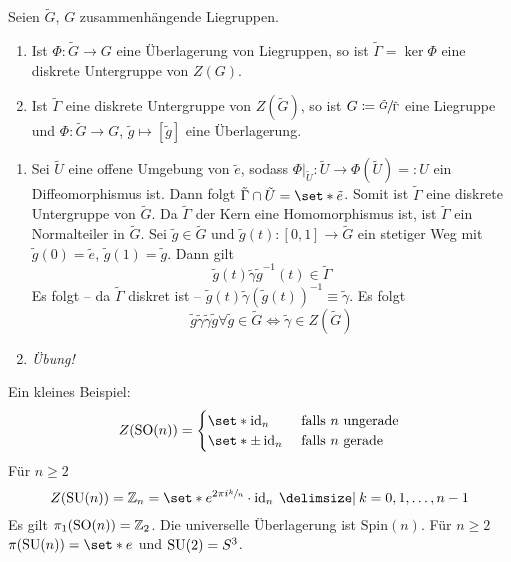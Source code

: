 \begin{korollar}[label=lem:133]
    Seien $\tilde{G}$, $G$ zusammenhängende Liegruppen. 
    \begin{enumerate}[1)]
        \item Ist $\Phi \colon \tilde{G} \to G$ eine Überlagerung von Liegruppen, so ist $\tilde{\Gamma} = \ker \Phi$ eine diskrete Untergruppe von $Z(G)$.
        \item Ist $\tilde{\Gamma}$ eine diskrete Untergruppe von $Z(\tilde{G})$, so ist $G \coloneqq \sfrac{\tilde{G}}{\tilde{\Gamma}}$ eine Liegruppe und $\Phi \colon \tilde{G} \to G$, $\tilde{g} \mapsto [\tilde{g}]$ eine Überlagerung.
    \end{enumerate}
\end{korollar}
\begin{beweis}
    \begin{enumerate}[1)]
        \item Sei $\tilde{U}$ eine offene Umgebung von $\tilde{e}$, sodass $\Phi|_{\tilde{U}} \colon \tilde{U} \to \Phi(\tilde{U}) =: U$ ein Diffeomorphismus ist.
        Dann folgt $\tilde{\Gamma} \cap \tilde{U} = \set*{\tilde{e}}$.
        Somit ist $\tilde{\Gamma}$ eine diskrete Untergruppe von $\tilde{G}$.
        Da $\tilde{\Gamma}$ der Kern eine Homomorphismus ist, ist $\tilde{\Gamma}$ ein Normalteiler in $\tilde{G}$.
        Sei $\tilde{g} \in \tilde{G}$ und $\tilde{g}(t) \colon [0,1] \to \tilde{G}$ ein stetiger Weg mit $\tilde{g}(0)=\tilde{e}$, $\tilde{g}(1)=\tilde{g}$.
        Dann gilt
        \[
            \tilde{g}(t) \tilde{\gamma} \tilde{g}^{-1}(t) \in \tilde{\Gamma}
        \]
        Es folgt -- da $\tilde{\Gamma}$ diskret ist -- $\tilde{g}(t) \tilde{\gamma} (\tilde{g}(t))^{-1} \equiv \tilde{\gamma}$.
        Es folgt 
        \[
            \tilde{g} \tilde{\gamma} \tilde{\gamma} \tilde{g} \forall \tilde{g} \in \tilde{G} \iff \tilde{\gamma} \in Z(\tilde{G})
        \]
        \item \emph{Übung!}
    \end{enumerate}
\end{beweis}

Ein kleines Beispiel:
\[
    Z \enbrace*{\SO(n)} = \begin{cases}
        \set*{\id_n} &\text{ falls } n \text{ ungerade} \\
        \set*{\pm \id_n} &\text{ falls $n$ gerade}
    \end{cases}
\]
Für $n \ge 2$
\[
    Z \enbrace*{\SU(n)} = \mathbb{Z}_n = \set*{e^{2 \pi i \sfrac{k}{n}} \cdot \id_n \given k=0,1,\ldots ,n-1 }
\]
Es gilt $\pi_1(\operatorname{SO}(n))= \mathbb{Z}_2$.
Die universelle Überlagerung ist $\mathrm{Spin}(n)$.
Für $n\ge 2$ $\pi \enbrace*{\SU(n)} = \set*{e}$ und $\operatorname{SU}(2) = S^3$.

